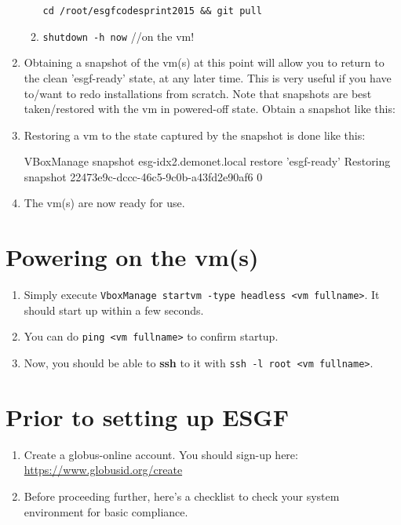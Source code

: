 \begin{enumerate}
\begin{enumerate}
\texttt{cd /root/esgfcodesprint2015 \&\& git pull}
\item \texttt{shutdown -h now} //on the vm!
\end{enumerate}
\item Obtaining a snapshot of the vm(s) at this point will allow you to return to the clean 'esgf-ready' state, at any later time. This is very useful if you have to/want to redo installations from scratch. Note that snapshots are best taken/restored with the vm in powered-off state. Obtain a snapshot like this:
\begin{small}
\end{small}
\item Restoring a vm to the state captured by the snapshot is done like this:
\begin{small}
\begin{verbatimtab}[4]
VBoxManage snapshot esg-idx2.demonet.local restore 'esgf-ready'
Restoring snapshot 22473e9c-dccc-46c5-9c0b-a43fd2e90af6
0%
\end{verbatimtab}
\end{small}
\item The vm(s) are now ready for use.
\end{enumerate}
\section{Powering on the vm(s)}
\label{powon}
\begin{enumerate}
\item Simply execute \texttt{VboxManage startvm -type headless <vm fullname>}. It should start up within a few seconds. 
\item You can do \texttt{ping <vm fullname>} to confirm startup. 
\item Now, you should be able to \textbf{ssh} to it with \texttt{ssh -l root <vm fullname>}.
\end{enumerate}
\section{Prior to setting up ESGF}
\begin{enumerate}
\item
  Create a globus-online account. You should sign-up here:
  \url{https://www.globusid.org/create}
\item
  Before proceeding further, here's a checklist to check your system
  environment for basic compliance. 
\end{enumerate}

